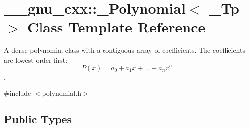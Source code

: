 \hypertarget{class____gnu__cxx_1_1__Polynomial}{}\section{\+\_\+\+\_\+gnu\+\_\+cxx\+:\+:\+\_\+\+Polynomial$<$ \+\_\+\+Tp $>$ Class Template Reference}
\label{class____gnu__cxx_1_1__Polynomial}


A dense polynomial class with a contiguous array of coefficients. The coefficients are lowest-\/order first\+: \[ P(x) = a_0 + a_1 x + ... + a_n x^n \].  




{\ttfamily \#include $<$polynomial.\+h$>$}

\subsection*{Public Types}
